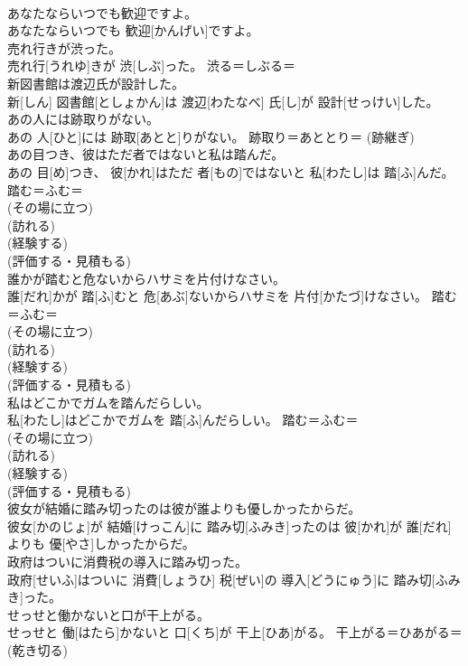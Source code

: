 \documentclass[8pt]{extreport}
\begin{document}
\begin{CJK}{UTF8}{min}
{\\	あなたならいつでも歓迎ですよ。	
\\	あなたならいつでも 歓迎[かんげい]ですよ。	
\\	売れ行きが渋った。	
\\	売れ行[うれゆ]きが 渋[しぶ]った。	渋る＝しぶる＝ 
\\	新図書館は渡辺氏が設計した。	
\\	新[しん] 図書館[としょかん]は 渡辺[わたなべ] 氏[し]が 設計[せっけい]した。	
\\	あの人には跡取りがない。	
\\	あの 人[ひと]には 跡取[あとと]りがない。	跡取り＝あととり＝ (跡継ぎ) 
\\	あの目つき、彼はただ者ではないと私は踏んだ。	
\\	あの 目[め]つき、 彼[かれ]はただ 者[もの]ではないと 私[わたし]は 踏[ふ]んだ。	踏む＝ふむ＝ 
\\	(その場に立つ) 
\\	(訪れる) 
\\	(経験する) 
\\	(評価する・見積もる) 
\\	誰かが踏むと危ないからハサミを片付けなさい。	
\\	誰[だれ]かが 踏[ふ]むと 危[あぶ]ないからハサミを 片付[かたづ]けなさい。	踏む＝ふむ＝ 
\\	(その場に立つ) 
\\	(訪れる) 
\\	(経験する) 
\\	(評価する・見積もる) 
\\	私はどこかでガムを踏んだらしい。	
\\	私[わたし]はどこかでガムを 踏[ふ]んだらしい。	踏む＝ふむ＝ 
\\	(その場に立つ) 
\\	(訪れる) 
\\	(経験する) 
\\	(評価する・見積もる) 
\\	彼女が結婚に踏み切ったのは彼が誰よりも優しかったからだ。	
\\	彼女[かのじょ]が 結婚[けっこん]に 踏み切[ふみき]ったのは 彼[かれ]が 誰[だれ]よりも 優[やさ]しかったからだ。	
\\	政府はついに消費税の導入に踏み切った。	
\\	政府[せいふ]はついに 消費[しょうひ] 税[ぜい]の 導入[どうにゅう]に 踏み切[ふみき]った。	
\\	せっせと働かないと口が干上がる。	
\\	せっせと 働[はたら]かないと 口[くち]が 干上[ひあ]がる。	干上がる＝ひあがる＝ (乾き切る) 
}
\end{CJK}
\end{document}
